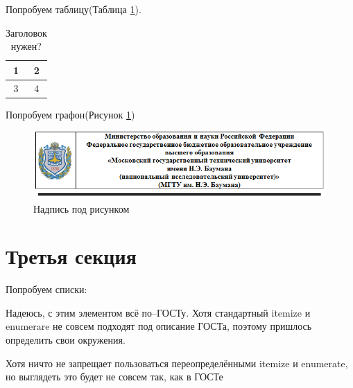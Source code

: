 \documentclass{article}
\begin{document}
Попробуем таблицу(Таблица \ref{tablekey}).

\begin{table}[h!]
\caption{Заголовок нужен?}
	\begin{center}
		\begin{tabular}{|c|c|}
			\hline 
			1 & 2 \\ 
			\hline 
			3 & 4 \\ 
			\hline 
		\end{tabular} 
	\end{center}
\label{tablekey}
\end{table}

Попробуем графон(Рисунок \ref{fig:fortitle})

\begin{figure}[h!]
	\centering
	\includegraphics[width=0.7\linewidth]{For_title}
	\caption{Надпись под рисунком}
	\label{fig:fortitle}
\end{figure}

\section{Третья секция}

Попробуем списки:

\begin{GostItemize}
\item Надеюсь, с этим элементом всё по--ГОСТу. Хотя стандартный itemize и enumerare не совсем подходят под описание ГОСТа, поэтому пришлось определить свои окружения.

\item Хотя ничто не запрещает пользоваться переопределёнными itemize и enumerate, но выглядеть это будет не совсем так, как в ГОСТе
\end{GostItemize}
\end{document}
